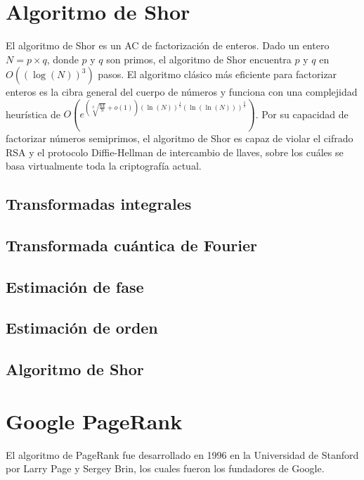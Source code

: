 \documentclass[11pt, spanish]{report}
\begin{document}
\chapter{Algoritmo de Shor}
El algoritmo de Shor es un AC de factorización de enteros. Dado un entero $N=p \times q$, donde $p$ y $q$ son primos, el algoritmo de Shor encuentra $p$ y $q$ en $O((\log(N))^3)$ pasos. El algoritmo clásico más eficiente para factorizar enteros es la cibra general del cuerpo de números y funciona con una complejidad heurística de $O(e^{(\sqrt[3]{\frac{64}{9}}+o(1))(\ln(N))^{\frac{1}{3}}(\ln(\ln(N)))^{\frac{2}{3}}})$. Por su capacidad de factorizar números semiprimos, el algoritmo de Shor es capaz de violar el cifrado RSA y el protocolo Diffie-Hellman de intercambio de llaves, sobre los cuáles se basa virtualmente toda la criptografía actual.

\section{Transformadas integrales}

\section{Transformada cuántica de Fourier}

\section{Estimación de fase}

\section{Estimación de orden}

\section{Algoritmo de Shor}

\chapter{Google PageRank}

El algoritmo de PageRank fue desarrollado en 1996 en la Universidad de Stanford por Larry Page y Sergey Brin, los cuales fueron los fundadores de Google.
\end{document}
